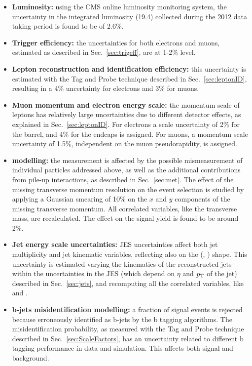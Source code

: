 \begin{itemize}
\item {\bf Luminosity:} using the CMS online luminosity monitoring system, the uncertainty in the integrated luminosity (19.4\ifb) collected during the 2012 data taking period is found to be of $2.6\%$.

\item {\bf Trigger efficiency:} the uncertainties for both electrons and muons, estimated as described in Sec.~\ref{sec:trigeff}, are at 1-2\% level.

\item {\bf Lepton reconstruction and identification efficiency:} 
this uncertainty is estimated with the Tag and Probe technique described in Sec.~\ref{sec:leptonID}, resulting in a 4\% uncertainty for electrons and 3\% for muons.

\item {\bf Muon momentum and electron energy scale:} 
the momentum scale of leptons has relatively large uncertainties due to different detector effects, as explained in Sec.~\ref{sec:leptonID}. For electrons a scale uncertainty of 2\% for the barrel, and 4\% for the endcaps is assigned. For muons, a momentum scale uncertainty of 1.5\%, independent on the muon pseudorapidity, is assigned.

\item {\bf {\boldmath \MET} modelling:} 
  the \MET measurement is affected by the possible mismeasurement of 
  individual particles addressed above, as well as the additional contributions 
  from pile-up interactions, as described in Sec.~\ref{sec:met}. 
  The effect of the missing transverse momentum resolution on the event selection
  is studied by applying a Gaussian smearing of 10\% on the $x$ and
  $y$ components of the missing transverse momentum. All correlated variables,
  like the transverse mass, are recalculated. The effect on the signal yield is found to be around 2\%.

\item {\bf Jet energy scale uncertainties:} 
  JES uncertainties affect both jet multiplicity and jet kinematic variables, reflecting also on the (\mll, \mt) shape.
  This uncertainty is estimated varying the kinematics of the reconstructed jets within the uncertainties in the JES (which depend on $\eta$ and $p_\mathrm{T}$ of the jet) described in Sec.~\ref{sec:jets}, and recomputing all the correlated variables, like \mll and \mt.

\item {\bf b-jets misidentification modelling:}
a fraction of signal events is rejected because erroneously identified as b-jets by the b tagging algorithms. The misidentification probability, as measured with the Tag and Probe technique described in Sec.~\ref{sec:ScaleFactors}, has an uncertainty related to different b tagging performance in data and simulation. This affects both signal and background.
          

\end{itemize}
